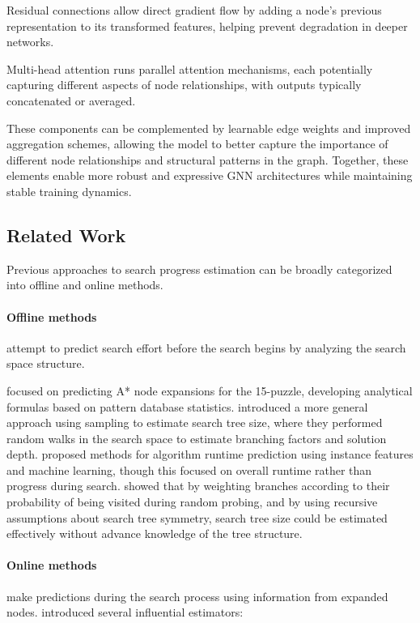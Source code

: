 \documentclass[letterpaper]{article}
\begin{document}
Residual connections allow direct gradient flow by adding a node's previous representation to its transformed features, helping prevent degradation in deeper networks. 

Multi-head attention runs parallel attention mechanisms, each potentially capturing different aspects of node relationships, with outputs typically concatenated or averaged. 

These components can be complemented by learnable edge weights and improved aggregation schemes, allowing the model to better capture the importance of different node relationships and structural patterns in the graph. Together, these elements enable more robust and expressive GNN architectures while maintaining stable training dynamics.


\subsection{Related Work}

Previous approaches to search progress estimation can be broadly categorized into offline and online methods. 

\paragraph{Offline methods} attempt to predict search effort before the search begins by analyzing the search space structure. 

\citet{breyer2008recent} focused on predicting A* node expansions for the 15-puzzle, developing analytical formulas based on pattern database statistics. 
\citet{lelis2014estimating} introduced a more general approach using sampling to estimate search tree size, where they performed random walks in the search space to estimate branching factors and solution depth. \citet{hutter2014algorithm} proposed methods for algorithm runtime prediction using instance features and machine learning, though this focused on overall runtime rather than progress during search. \citet{kilby2006estimating} showed that by weighting branches according to their probability of being visited during random probing, and by using recursive assumptions about search tree symmetry, search tree size could be estimated effectively without advance knowledge of the tree structure.

\paragraph{Online methods} make predictions during the search process using information from expanded nodes. \citet{thayer2012we} introduced several influential estimators:
\end{document}
